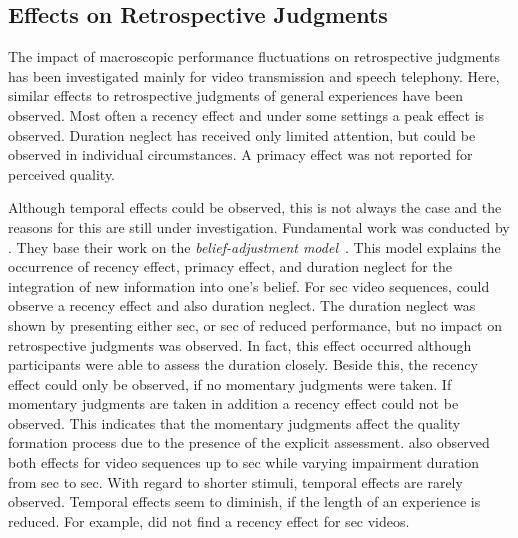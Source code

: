 \subsection{Effects on Retrospective Judgments}
The impact of macroscopic performance fluctuations on retrospective judgments has been investigated mainly for video transmission and speech telephony.
Here, similar effects to retrospective judgments of general experiences have been observed.
Most often a recency effect and under some settings a peak effect is observed.
Duration neglect has received only limited attention, but could be observed in individual circumstances.
A primacy effect was not reported for perceived quality.

Although temporal effects could be observed, this is not always the case and the reasons for this are still under investigation.
Fundamental work was conducted by \citet{hands_recency_2001}.
They base their work on the \emph{belief-adjustment model}~\citep{hogarth_order_1992}.
This model explains the occurrence of recency effect, primacy effect, and duration neglect for the integration of new information into one's belief. %
For \unit[30]{sec} video sequences, \citet{hands_recency_2001} could observe a recency effect and also duration neglect.
The duration neglect was shown by presenting either \unit[5]{sec}, or \unit[10]{sec} of reduced performance, but no impact on retrospective judgments was observed.
In fact, this effect occurred although participants were able to assess the duration closely. %
Beside this, the recency effect could only be observed, if no momentary judgments were taken.
If momentary judgments are taken in addition a recency effect could not be observed.
This indicates that the momentary judgments affect the quality formation process due to the presence of the explicit assessment.
\citet{hamberg_time-varying_1999} also observed both effects for video sequences up to \unit[180]{sec} while varying impairment duration from \unit[2]{sec} to \unit[10]{sec}.
With regard to shorter stimuli, temporal effects are rarely observed.
Temporal effects seem to diminish, if the length of an experience is reduced.
For example, \citet{ninassi_considering_2009} did not find a recency effect for \unit[8]{sec} videos.

